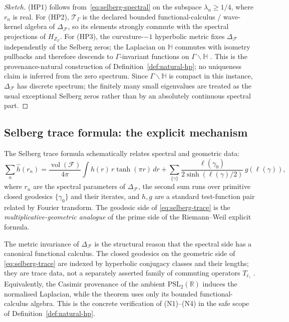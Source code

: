 \documentclass[11pt]{article}
\theoremstyle{definition}
\theoremstyle{remark}
\newcommand{\PSL}{\mathrm{PSL}}
\begin{document}
\begin{proof}[Sketch]
(HP1) follows from~\eqref{eq:selberg-spectral} on the subspace
$\lambda_n\geq 1/4$, where $r_n$ is real. For (HP2),
$\mathcal{T}_\Gamma$ is the declared bounded functional-calculus /
wave-kernel algebra of $\Delta_\mathcal{F}$, so its elements strongly
commute with the spectral projections of $H_{Z_\Gamma}$. For (HP3),
the curvature-$-1$ hyperbolic metric fixes $\Delta_\mathcal{F}$
independently of the Selberg zeros; the Laplacian on $\mathbb{H}$
commutes with isometry pullbacks and therefore descends to
$\Gamma$-invariant functions on $\Gamma\backslash\mathbb{H}$
\cite{Marklof2008}. This is the provenance-natural construction of
Definition~\ref{def:natural-hp}; no uniqueness claim is inferred from
the zero spectrum. Since $\Gamma\backslash\mathbb{H}$ is compact in
this instance, $\Delta_\mathcal{F}$ has discrete spectrum; the finitely
many small eigenvalues are treated as the usual exceptional Selberg
zeros rather than by an absolutely continuous spectral part.
\end{proof}

\subsection{Selberg trace formula: the explicit mechanism}
\label{sec:selberg-trace}

The Selberg trace formula \cite{Selberg1956} schematically relates
spectral and geometric data:
\begin{equation}
\label{eq:selberg-trace}
  \sum_n \widehat{h}(r_n)
  = \frac{\operatorname{vol}(\mathcal{F})}{4\pi} \int h(r)\,r\tanh(\pi r)\,dr
  + \sum_{\{\gamma\}} \frac{\ell(\gamma_0)}{2\sinh(\ell(\gamma)/2)}\,
      g(\ell(\gamma)),
\end{equation}
where $r_n$ are the spectral parameters of $\Delta_\mathcal{F}$, the
second sum runs over primitive closed geodesics $\{\gamma_0\}$ and
their iterates, and $h, g$ are a standard test-function pair related
by Fourier transform. The geodesic side of \eqref{eq:selberg-trace}
is the \emph{multiplicative-geometric analogue} of the prime side of
the Riemann--Weil explicit formula.

The metric invariance of $\Delta_\mathcal{F}$ is the structural reason
that the spectral side has a canonical functional calculus. The
closed geodesics on the geometric side of
\eqref{eq:selberg-trace} are indexed by hyperbolic conjugacy classes
and their lengths; they are trace data, not a separately asserted
family of commuting operators $T_{\ell_\gamma}$
\cite{Selberg1956,Marklof2008}. Equivalently, the Casimir provenance
of the ambient $\PSL_2(\mathbb{R})$ induces the normalised Laplacian,
while the theorem uses only its bounded functional-calculus algebra.
This is the concrete verification of (N1)--(N4) in the safe scope of
Definition~\ref{def:natural-hp}.
\end{document}
